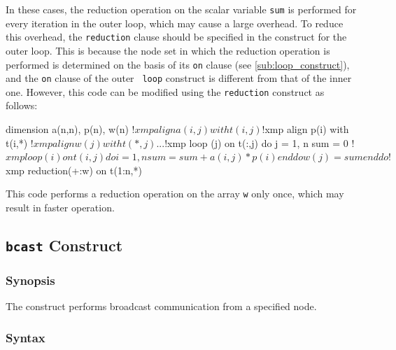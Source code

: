 \begin{description}

In these cases, the reduction operation on the scalar variable {\tt sum}
is performed for every iteration in the outer loop, which may cause a
large overhead.
To reduce this overhead, the {\tt reduction} clause should be specified
in the {\tt {}} construct for the outer loop.
%
This is because the node set in which the reduction operation is
performed is determined on the basis of its {\tt on} clause (see
\ref{sub:loop_construct}), and the {\tt on} clause of the outer {\tt
loop} construct is different from that of the inner one. 
%
However, this code can be modified using the {\tt reduction}
construct as follows: 

\begin{XFexample}
      dimension a(n,n), p(n), w(n)
!$xmp align a(i,j) with t(i,j)
!$xmp align p(i) with t(i,*)
!$xmp align w(j) with t(*,j)
      ...
!$xmp loop (j) on t(:,j)
      do j = 1, n
          sum = 0
!$xmp loop (i) on t(i,j) 
          do i = 1, n
              sum = sum + a(i,j) * p(i)
          end do
          w(j) = sum
      end do
!$xmp reduction(+:w) on t(1:n,*)
\end{XFexample}

This code performs a reduction operation on the array {\tt w} only once,
which may result in faster operation.  

\end{description}


\subsection{{\tt bcast} Construct}

\subsubsection*{Synopsis}

The {\tt {}} construct performs broadcast communication
from a specified node.

\subsubsection*{Syntax}

